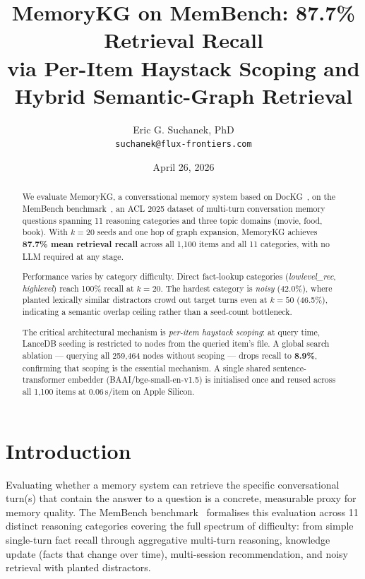 \documentclass[11pt,a4paper]{article}
\title{\textbf{MemoryKG on MemBench: 87.7\% Retrieval Recall}\\
       \large via Per-Item Haystack Scoping and Hybrid Semantic-Graph Retrieval}
\author{Eric G. Suchanek, PhD\\
        \texttt{suchanek@flux-frontiers.com}}
\date{April 26, 2026}
\begin{document}
\maketitle

\begin{abstract}
We evaluate MemoryKG, a conversational memory system based on
DocKG~\citep{dockg2026}, on the MemBench benchmark~\citep{membench2025},
an ACL 2025 dataset of multi-turn conversation memory questions spanning
11 reasoning categories and three topic domains (movie, food, book).
With $k{=}20$ seeds and one hop of graph expansion, MemoryKG achieves
\textbf{87.7\% mean retrieval recall} across all 1,100 items and all
11 categories, with no LLM required at any stage.

Performance varies by category difficulty.
Direct fact-lookup categories (\textit{lowlevel\_rec}, \textit{highlevel})
reach 100\% recall at $k{=}20$.
The hardest category is \textit{noisy} (42.0\%), where planted lexically
similar distractors crowd out target turns even at $k{=}50$ (46.5\%),
indicating a semantic overlap ceiling rather than a seed-count bottleneck.

The critical architectural mechanism is \textit{per-item haystack scoping}:
at query time, LanceDB seeding is restricted to nodes from the queried
item's file.
A global search ablation --- querying all 259,464 nodes without scoping ---
drops recall to \textbf{8.9\%}, confirming that scoping is the essential
mechanism.
A single shared sentence-transformer embedder (BAAI/bge-small-en-v1.5) is
initialised once and reused across all 1,100 items at 0.06\,s/item on
Apple Silicon.
\end{abstract}

\section{Introduction}
\label{sec:intro}

Evaluating whether a memory system can retrieve the specific conversational
turn(s) that contain the answer to a question is a concrete, measurable proxy
for memory quality.
The MemBench benchmark~\citep{membench2025} formalises this evaluation across
11 distinct reasoning categories covering the full spectrum of difficulty:
from simple single-turn fact recall through aggregative multi-turn reasoning,
knowledge update (facts that change over time), multi-session recommendation,
and noisy retrieval with planted distractors.
\end{document}
